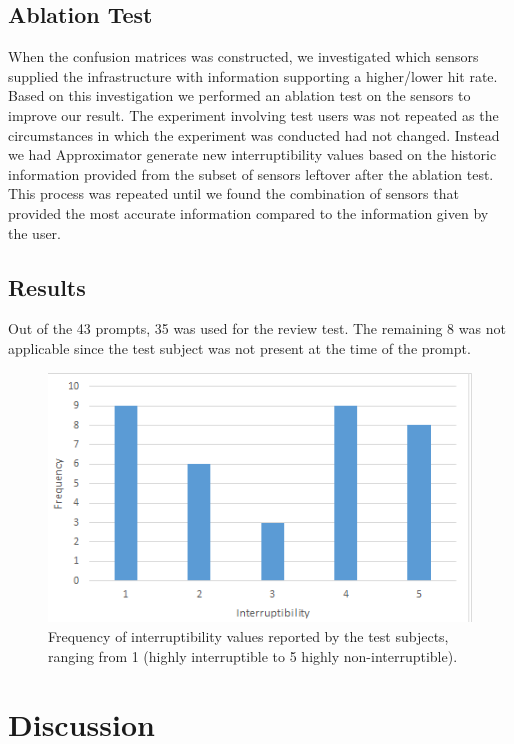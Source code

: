 \documentclass{sigchi}
\begin{document}
\subsection{Ablation Test}
When the confusion matrices was constructed, we investigated which sensors supplied the infrastructure with information supporting a higher/lower hit rate.
Based on this investigation we performed an ablation test on the sensors to improve our result.
The experiment involving test users was not repeated as the circumstances in which the experiment was conducted had not changed.
Instead we had Approximator generate new interruptibility values based on the historic information provided from the subset of sensors leftover after the ablation test.
This process was repeated until we found the combination of sensors that provided the most accurate information compared to the information given by the user.

\subsection{Results}
Out of the 43 prompts, 35 was used for the review test.
The remaining 8 was not applicable since the test subject was not present at the time of the prompt.

\begin{figure}
  \centering
  \includegraphics[width=\columnwidth]{figures/Interruptibility_values_videotest.png}
  \caption{Frequency of interruptibility values reported by the test subjects, ranging from 1 (highly interruptible to 5 highly non-interruptible).}
  \label{fig:interruptibilityFrequency}
\end{figure}

\section{Discussion}
\end{document}
